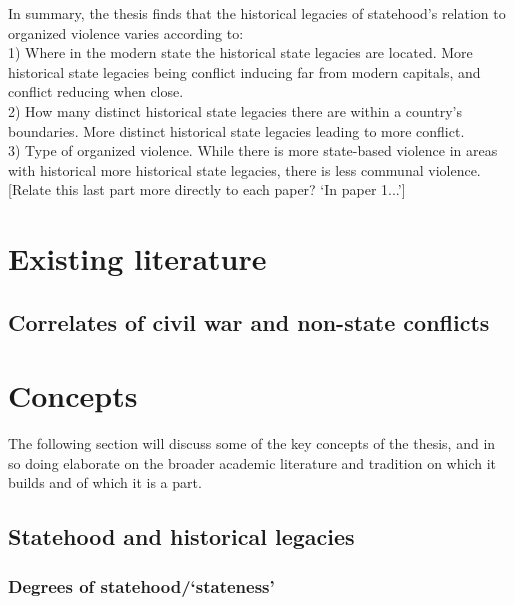 \documentclass[12pt]{article}
\begin{document}
In summary, the thesis finds that the historical legacies of statehood's
relation to organized violence varies according to:\\

1) Where in the modern state the historical state legacies are located. More
historical state legacies being conflict inducing far from modern capitals, and
conflict reducing when close.\\

2) How many distinct historical state legacies there are within a country's 
boundaries. More distinct historical state legacies leading to more conflict.\\

3) Type of organized violence. While there is more state-based violence in areas
with historical more historical state legacies, there is less communal
violence.\\

[Relate this last part more directly to each paper? `In paper 1...']

\section{Existing literature} \label{Existing literature}
\subsection{Correlates of civil war and non-state conflicts} 
\label{Correlates of civil war and non-state conflicts}

\section{Concepts} \label{Concepts}

The following section will discuss some of the key concepts of the thesis, and in
so doing elaborate on the broader academic literature and tradition on which it
builds and of which it is a part.

\subsection{Statehood and historical legacies} \label{Statehood and historical legacies}

\subsubsection{Degrees of statehood/`stateness'} \label{Degrees of statehood} %
\end{document}
